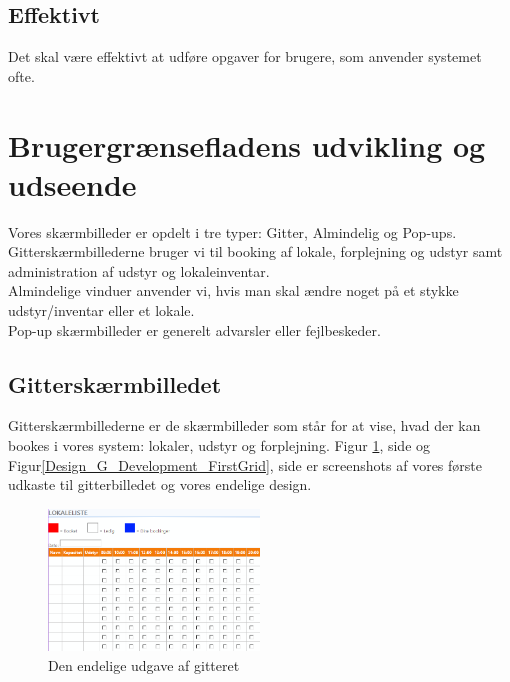 \subsection{Effektivt}
Det skal være effektivt at udføre opgaver for brugere, som anvender systemet ofte.

\section{Brugergrænsefladens udvikling og udseende}
\label{Design_G_Development}
Vores skærmbilleder er opdelt i tre typer: Gitter, Almindelig og Pop-ups. 
\\Gitterskærmbillederne bruger vi til booking af lokale, forplejning og udstyr samt administration af udstyr og lokaleinventar.
\\Almindelige vinduer anvender vi, hvis man skal ændre noget på et stykke udstyr/inventar eller et lokale.
\\Pop-up skærmbilleder er generelt advarsler eller fejlbeskeder.

\subsection{Gitterskærmbilledet}
\label{Design_G_Development_Grid}
Gitterskærmbillederne er de skærmbilleder som står for at vise, hvad der kan bookes i vores system: lokaler, udstyr og forplejning.
Figur \ref{Design_G_Development_FinalGrid}, side \pageref{Design_G_Development_FinalGrid} og Figur\ref{Design_G_Development_FirstGrid}, side \pageref{Design_G_Development_FirstGrid} er screenshots af vores første udkaste til gitterbilledet og vores endelige design.
\begin{figure}[h!]
  \centering
    \includegraphics[width=0.5\textwidth]{Appendix/GUI-Prototype/DigitalMockup/GridEksempel}
  \caption{Den endelige udgave af gitteret}
\label{Design_G_Development_FinalGrid}
\end{figure}

